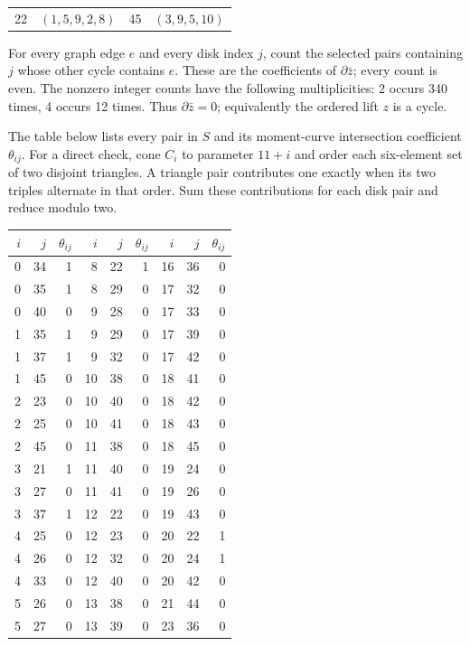 \documentclass[11pt]{article}
\begin{document}
\begin{appendices}
\begin{center}
\begin{tabular}{r l @{\qquad} r l}
22 & $(1,5,9,2,8)$ & 45 & $(3,9,5,10)$\\
\end{tabular}\end{center}
For every graph edge $e$ and every disk index $j$, count the selected
pairs containing $j$ whose other cycle contains $e$. These are the
coefficients of $\partial\bar z$; every count is even. The nonzero
integer counts have the following multiplicities: 2 occurs 340 times, 4 occurs 12 times.
Thus $\partial\bar z=0$; equivalently the ordered lift $z$ is a cycle.
\par The table below lists every pair in $S$ and its moment-curve
intersection coefficient $\theta_{ij}$. For a direct check, cone $C_i$
to parameter $11+i$ and order each six-element set of two disjoint
triangles. A triangle pair contributes one exactly when its two
triples alternate in that order. Sum these contributions for each
disk pair and reduce modulo two.
\begin{center}\small
\begin{tabular}{r r r @{\qquad} r r r @{\qquad} r r r}
$i$&$j$&$\theta_{ij}$&$i$&$j$&$\theta_{ij}$&$i$&$j$&$\theta_{ij}$\\\hline
0 & 34 & 1 & 8 & 22 & 1 & 16 & 36 & 0\\
0 & 35 & 1 & 8 & 29 & 0 & 17 & 32 & 0\\
0 & 40 & 0 & 9 & 28 & 0 & 17 & 33 & 0\\
1 & 35 & 1 & 9 & 29 & 0 & 17 & 39 & 0\\
1 & 37 & 1 & 9 & 32 & 0 & 17 & 42 & 0\\
1 & 45 & 0 & 10 & 38 & 0 & 18 & 41 & 0\\
2 & 23 & 0 & 10 & 40 & 0 & 18 & 42 & 0\\
2 & 25 & 0 & 10 & 41 & 0 & 18 & 43 & 0\\
2 & 45 & 0 & 11 & 38 & 0 & 18 & 45 & 0\\
3 & 21 & 1 & 11 & 40 & 0 & 19 & 24 & 0\\
3 & 27 & 0 & 11 & 41 & 0 & 19 & 26 & 0\\
3 & 37 & 1 & 12 & 22 & 0 & 19 & 43 & 0\\
4 & 25 & 0 & 12 & 23 & 0 & 20 & 22 & 1\\
4 & 26 & 0 & 12 & 32 & 0 & 20 & 24 & 1\\
4 & 33 & 0 & 12 & 40 & 0 & 20 & 42 & 0\\
5 & 26 & 0 & 13 & 38 & 0 & 21 & 44 & 0\\
5 & 27 & 0 & 13 & 39 & 0 & 23 & 36 & 0\\

\end{tabular}
\end{center}
\end{appendices}
\end{document}
